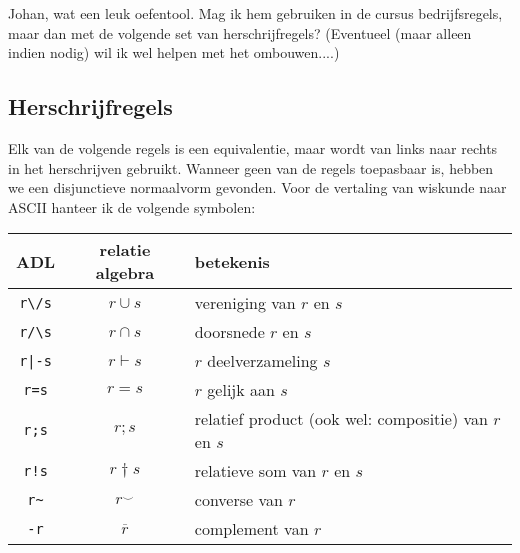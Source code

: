 \documentclass[11pt,a4paper,fleqn,oneside]{article}
\newcommand{\flip}[1]{{#1}^\smallsmile} %
\newcommand{\cmpl}[1]{\overline{#1}}
\newcommand{\subs}{\vdash}
\begin{document}
	Johan, wat een leuk oefentool. Mag ik hem gebruiken in de cursus bedrijfsregels, maar dan met de volgende set van herschrijfregels? (Eventueel (maar alleen indien nodig) wil ik wel helpen met het ombouwen....)

\subsection{Herschrijfregels}
	Elk van de volgende regels is een equivalentie, maar wordt van links naar rechts in het herschrijven gebruikt.
	Wanneer geen van de regels toepasbaar is, hebben we een disjunctieve normaalvorm gevonden.
	Voor de vertaling van wiskunde naar ASCII hanteer ik de volgende symbolen:

\begin{tabular}{|c|c|l|}
\hline
	ADL	&	relatie algebra&	betekenis\\
\hline
\verb#r\/s#	&	$r\cup s$	&	vereniging van $r$ en $s$\\
\verb#r/\s#	&	$r\cap s$	&	doorsnede $r$ en $s$\\
\verb#r|-s#	&	$r\subs s$	&	$r$ deelverzameling $s$\\
\verb#r=s#	&	$r=s$		&	$r$ gelijk aan $s$\\
\verb#r;s#	&	$r;s$		&	relatief product (ook wel: compositie) van $r$ en $s$\\
\verb#r!s#	&	$r\dagger s$	&	relatieve som van $r$ en $s$\\
\verb#r~#	&	$\flip{r}$	&	converse van $r$\\
\verb#-r#	&	$\cmpl{r}$	&	complement van $r$\\
\hline
\end{tabular}
\end{document}

